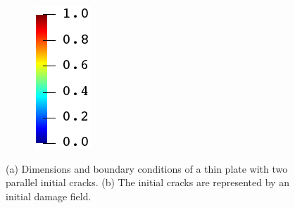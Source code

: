 \begin{figure}[htb!]
\begin{subfigure}[b]{0.07\textwidth}
    \includegraphics[width=\textwidth]{Chapter4/figures/jet_vertical.png}
    \vspace{0.15in}
  \end{subfigure}
  \caption{(a) Dimensions and boundary conditions of a thin plate with two parallel initial cracks. (b) The initial cracks are represented by an initial damage field.}
  \label{fig: Chapter4/biaxial_schematic}
\end{figure}
